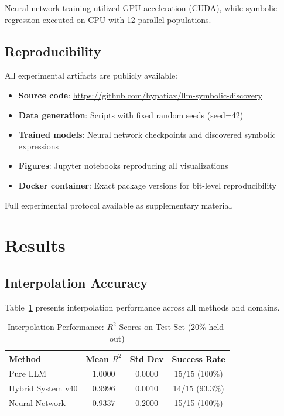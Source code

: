 \documentclass[twoside,11pt]{article}
\begin{document}
Neural network training utilized GPU acceleration (CUDA), while symbolic regression executed on CPU with 12 parallel populations.

\subsection{Reproducibility}

All experimental artifacts are publicly available:

\begin{itemize}
    \item \textbf{Source code}: \url{https://github.com/hypatiax/llm-symbolic-discovery}
    \item \textbf{Data generation}: Scripts with fixed random seeds (seed=42)
    \item \textbf{Trained models}: Neural network checkpoints and discovered symbolic expressions
    \item \textbf{Figures}: Jupyter notebooks reproducing all visualizations
    \item \textbf{Docker container}: Exact package versions for bit-level reproducibility
\end{itemize}

Full experimental protocol available as supplementary material.

\section{Results}
\label{sec:results}

\subsection{Interpolation Accuracy}

Table~\ref{tab:interpolation_results} presents interpolation performance across all methods and domains.

\begin{table}[htbp]
\centering
\caption{Interpolation Performance: $R^2$ Scores on Test Set (20\% held-out)}
\label{tab:interpolation_results}
\begin{tabular}{lccc}
\toprule
\textbf{Method} & \textbf{Mean $R^2$} & \textbf{Std Dev} & \textbf{Success Rate} \\
\midrule
Pure LLM & $1.0000$ & $0.0000$ & 15/15 (100\%) \\
Hybrid System v40 & $0.9996$ & $0.0010$ & 14/15 (93.3\%) \\
Neural Network & $0.9337$ & $0.2000$ & 15/15 (100\%) \\
\bottomrule
\end{tabular}
\end{table}
\end{document}
